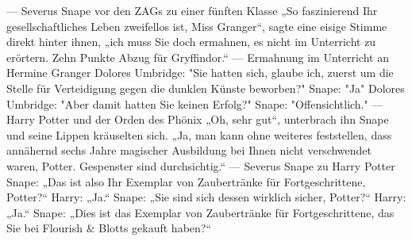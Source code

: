 \documentclass[a4paper, 10pt]{article}
\begin{document}
\vspace{10pt}
\newline
— Severus Snape vor den ZAGs zu einer fünften Klasse
\vspace{10pt}
\newline
„So faszinierend Ihr gesellschaftliches Leben zweifellos ist, Miss Granger“, sagte eine eisige Stimme direkt hinter ihnen, „ich muss Sie doch ermahnen, es nicht im Unterricht zu erörtern. Zehn Punkte Abzug für Gryffindor.“
\vspace{10pt}
\newline
— Ermahnung im Unterricht an Hermine Granger
\vspace{10pt}
\newline
Dolores Umbridge: "Sie hatten sich, glaube ich, zuerst um die Stelle für Verteidigung gegen die dunklen Künste beworben?"
\vspace{10pt}
\newline
Snape: "Ja"
\vspace{10pt}
\newline
Dolores Umbridge: "Aber damit hatten Sie keinen Erfolg?"
\vspace{10pt}
\newline
Snape: "Offensichtlich."
\vspace{10pt}
\newline
— Harry Potter und der Orden des Phönix
\vspace{10pt}
\newline
„Oh, sehr gut“, unterbrach ihn Snape und seine Lippen kräuselten sich. „Ja, man kann ohne weiteres feststellen, dass annähernd sechs Jahre magischer Ausbildung bei Ihnen nicht verschwendet waren, Potter. Gespenster sind durchsichtig.“
\vspace{10pt}
\newline
— Severus Snape zu Harry Potter
\vspace{10pt}
\newline
Snape: „Das ist also Ihr Exemplar von Zaubertränke für Fortgeschrittene, Potter?“
\vspace{10pt}
\newline
Harry: „Ja.“
\vspace{10pt}
\newline
Snape: „Sie sind sich dessen wirklich sicher, Potter?“
\vspace{10pt}
\newline
Harry: „Ja.“
\vspace{10pt}
\newline
Snape: „Dies ist das Exemplar von Zaubertränke für Fortgeschrittene, das Sie bei Flourish & Blotts gekauft haben?“
\end{document}
